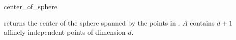 \begin{ccRefFunction}{center_of_sphere}
\ccHtmlNoLinks

{returns the center of the sphere spanned by the points in
\ccc{A = tuple[first,last)}.
\ccPrecond $A$ contains $d+1$ affinely independent points of
dimension $d$.}

\end{ccRefFunction}

